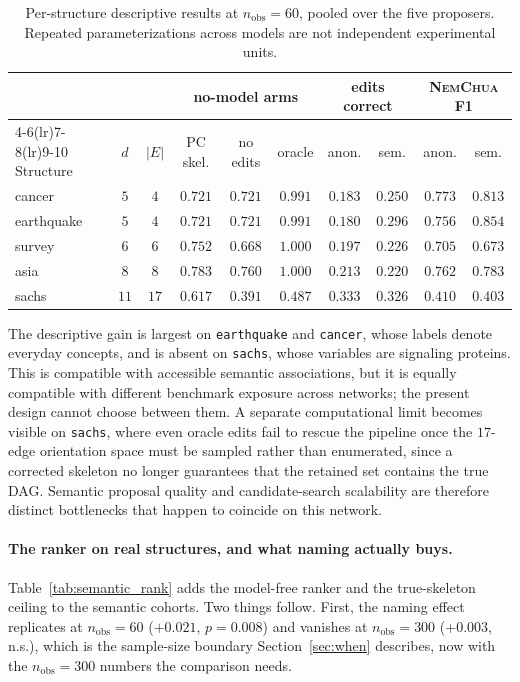 \documentclass{article}
\newcommand{\nem}{\textsc{NemChua}}
\begin{document}
\begin{table}[h]
\caption{Per-structure descriptive results at $n_{\mathrm{obs}}{=}60$, pooled over the five
proposers. Repeated parameterizations across models are not independent experimental units.}
\label{tab:semantic}
\centering
\small
\setlength{\tabcolsep}{4.5pt}
\begin{tabular}{lccccccccc}
\toprule
& & & \multicolumn{3}{c}{no-model arms} & \multicolumn{2}{c}{edits correct} & \multicolumn{2}{c}{\nem{} F1} \\
\cmidrule(lr){4-6}\cmidrule(lr){7-8}\cmidrule(lr){9-10}
Structure & $d$ & $|E|$ & PC skel. & no edits & oracle & anon. & sem. & anon. & sem. \\
\midrule
cancer     & $5$  & $4$  & $0.721$ & $0.721$ & $0.991$ & $0.183$ & $0.250$ & $0.773$ & $0.813$ \\
earthquake & $5$  & $4$  & $0.721$ & $0.721$ & $0.991$ & $0.180$ & $0.296$ & $0.756$ & $0.854$ \\
survey     & $6$  & $6$  & $0.752$ & $0.668$ & $1.000$ & $0.197$ & $0.226$ & $0.705$ & $0.673$ \\
asia       & $8$  & $8$  & $0.783$ & $0.760$ & $1.000$ & $0.213$ & $0.220$ & $0.762$ & $0.783$ \\
sachs      & $11$ & $17$ & $0.617$ & $0.391$ & $0.487$ & $0.333$ & $0.326$ & $0.410$ & $0.403$ \\
\bottomrule
\end{tabular}
\end{table}

The descriptive gain is largest on \texttt{earthquake} and \texttt{cancer}, whose labels denote
everyday concepts, and is absent on \texttt{sachs}, whose variables are signaling proteins. This is
compatible with accessible semantic associations, but it is equally compatible with different
benchmark exposure across networks; the present design cannot choose between them. A separate
computational limit becomes visible on \texttt{sachs}, where even oracle edits fail to rescue the
pipeline once the $17$-edge orientation space must be sampled rather than enumerated, since a
corrected skeleton no longer guarantees that the retained set contains the true DAG. Semantic
proposal quality and candidate-search scalability are therefore distinct bottlenecks that happen to
coincide on this network.

\paragraph{The ranker on real structures, and what naming actually buys.}
Table~\ref{tab:semantic_rank} adds the model-free ranker and the true-skeleton ceiling to the
semantic cohorts. Two things follow. First, the naming effect replicates at
$n_{\mathrm{obs}}{=}60$ ($+0.021$, $p=0.008$) and vanishes at $n_{\mathrm{obs}}{=}300$ ($+0.003$,
n.s.), which is the sample-size boundary Section~\ref{sec:when} describes, now with the
$n_{\mathrm{obs}}{=}300$ numbers the comparison needs.
\end{document}
